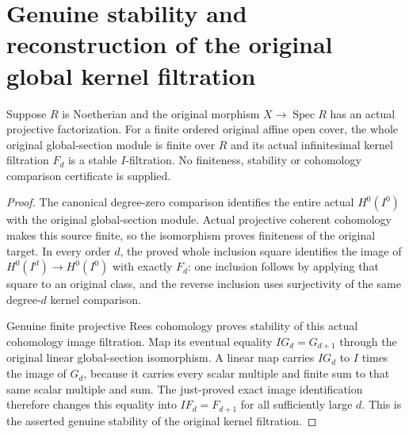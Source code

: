 \section{Genuine stability and reconstruction of the original global kernel filtration}

\begin{theorem}
\label{thm:fibre-global-kernel-filtration-stable}
\leanok
Suppose $R$ is Noetherian and the original morphism $X\to\operatorname{Spec}R$
has an actual projective factorization. For a finite ordered original
affine open cover, the whole original global-section module is finite
over $R$ and its actual infinitesimal kernel filtration $F_d$ is a
stable $I$-filtration. No finiteness, stability or cohomology comparison
certificate is supplied.
\end{theorem}
\begin{proof}
The canonical degree-zero comparison identifies the entire actual
$H^0(I^0)$ with the original global-section module. Actual projective
coherent cohomology makes this source finite, so the isomorphism proves
finiteness of the original target. In every order $d$, the proved
whole inclusion square identifies the image of $H^0(I^d)\to H^0(I^0)$
with exactly $F_d$: one inclusion follows by applying that square to
an original class, and the reverse inclusion uses surjectivity of the
same degree-$d$ kernel comparison.

Genuine finite projective Rees cohomology proves stability of this
actual cohomology image filtration. Map its eventual equality
$I G_d=G_{d+1}$ through the original linear global-section isomorphism.
A linear map carries $I G_d$ to $I$ times the image of $G_d$, because
it carries every scalar multiple and finite sum to that same scalar
multiple and sum. The just-proved exact image identification therefore
changes this equality into $I F_d=F_{d+1}$ for all sufficiently large
$d$. This is the asserted genuine stability of the original kernel
filtration.
\end{proof}

